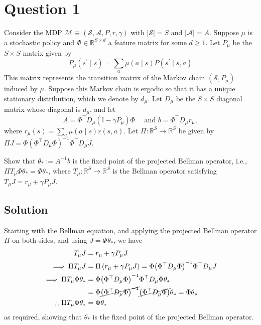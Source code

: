 \section*{Question 1}

Consider the MDP \( \mathcal{M} \equiv(\mathcal{S}, \mathcal{A}, P, r, \gamma) \) with \( \vert \mathcal{S} \vert = S \) and \( \vert \mathcal{A} \vert = A \).
Suppose \( \mu \) is a stochastic policy and \( \Phi \in \mathbb{R}^{S \times d} \) a feature matrix for some \( d \geq 1 \).
Let \( P_{\mu} \) be the \( S \times S \) matrix given by
\[
    P_{\mu}\left(s^{\prime} \mid s\right)=\sum_{a} \mu(a \mid s) P\left(s^{\prime} \mid s, a\right)
\]
This matrix represents the transition matrix of the Markov chain \( \left(\mathcal{S}, P_{\mu}\right) \) induced by \( \mu \).
Suppose this Markov chain is ergodic so that it has a unique stationary distribution, which we denote by \( d_{\mu} \).
Let \( D_{\mu} \) be the \( S \times S \) diagonal matrix whose diagonal is \( d_{\mu} \), and let
\[
    A=\Phi^{\top} D_{\mu}\left(\mathbb{I}-\gamma P_{\mu}\right) \Phi \quad \text { and } b=\Phi^{\top} D_{\mu} r_{\mu},
\]
where \( r_{\mu}(s)=\sum_{a} \mu(a \mid s) r(s, a) \).
Let \( \Pi: \mathbb{R}^{S} \rightarrow \mathbb{R}^{S} \) be given by \( \Pi J=\Phi{\left(\Phi^{\top} D_{\mu} \Phi\right)}^{-1} \Phi^{\top} D_{\mu} J \).

Show that \( \theta_{*}:=A^{-1} b \) is the fixed point of the projected Bellman operator, i.e., \( \Pi T_{\mu} \Phi \theta_{*}=\Phi \theta_{*} \), where \( T_{\mu}: \mathbb{R}^{S} \rightarrow \mathbb{R}^{S} \) is the Bellman operator satisfying \( T_{\mu} J=r_{\mu}+\gamma P_{\mu} J \).

\subsection*{Solution}

Starting with the Bellman equation, and applying the projected Bellman operator \( \Pi \) on both sides, and using \( J = \Phi \theta_{*} \), we have
\begin{align*}
    T_{\mu} J
     & =
    r_{\mu} + \gamma P_{\mu} J
    \\
    \implies
    \Pi T_{\mu} J
     & =
    \Pi \left(r_{\mu} + \gamma P_{\mu} J\right)
    =
    \Phi{\left(\Phi^{\top} D_{\mu} \Phi\right)}^{-1} \Phi^{\top} D_{\mu} J
    \\
    \implies
    \Pi T_{\mu} \Phi \theta_{*}
     & =
    \Phi{\left(\Phi^{\top} D_{\mu} \Phi\right)}^{-1} \Phi^{\top} D_{\mu} \Phi \theta_{*}
    \\ & =
    \Phi \cancel{{\left(\Phi^{\top} D_{\mu} \Phi\right)}^{-1}} \cancel{\left(\Phi^{\top} D_{\mu} \Phi\right)} \theta_{*}
    =
    \Phi \theta_{*}
    \\
    \therefore
    \Pi T_{\mu} \Phi \theta_{*}
     & =
    \Phi \theta_{*}
\end{align*}
as required, showing that \( \theta_{*} \) is the fixed point of the projected Bellman operator.

